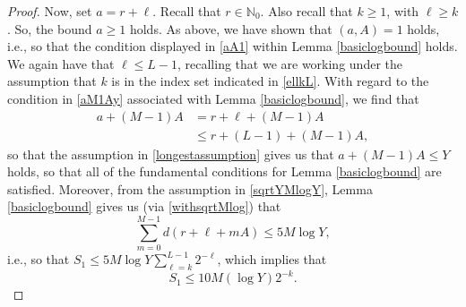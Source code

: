 \documentclass[10pt,a4paper]{amsart}
\begin{document}
\begin{proof}
 Now, set $a = r + \ell$. Recall that $r \in \mathbb{N}_{0}$. Also recall that $k \geq 1$, with $\ell \geq k$. So, the bound $a \geq 1$ 
 holds. As above, we have shown that $(a, A) = 1$ holds, i.e., so that the condition displayed in \eqref{aA1} within Lemma 
 \ref{basiclogbound} holds. We again have that $\ell \leq L-1$, recalling that we are working under the assumption that $k$ is in the 
 index set indicated in \eqref{ellkL}. With regard to the condition in \eqref{aM1Ay} associated with Lemma \ref{basiclogbound}, 
 we find that 
\begin{align*}
 a + (M-1) A & = r + \ell + (M-1) A \\ 
 & \leq r + (L-1) + (M-1) A, 
\end{align*}
 so that the assumption in \eqref{longestassumption} gives us that $a + (M - 1) A \leq Y$ holds, so that all of the fundamental 
 conditions for Lemma \ref{basiclogbound} are satisfied. Moreover, from the assumption in \eqref{sqrtYMlogY}, Lemma \ref{basiclogbound} 
 gives us (via \eqref{withsqrtMlog}) that $$ \sum_{m=0}^{M-1} d(r + \ell + m A) \leq 5 M \log Y, $$ i.e., so that $ S_{1} \leq 5 M \log Y 
 \sum_{\ell = k}^{L-1} 2^{-\ell}$, which implies that 
\begin{equation}\label{S1final} 
 S_{1} \leq 10 M (\log Y) 2^{-k}. 
\end{equation}


\end{proof}
\end{document}
